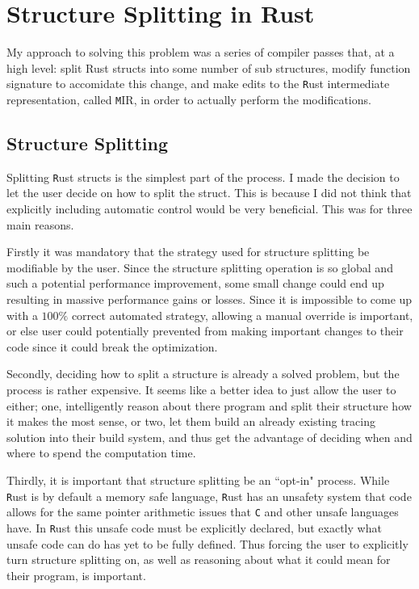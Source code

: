 \documentclass[12pt,final]{article}
\newcommand{\rust}[1]{\texttt{#1}}
\newcommand{\rustname}{{\texttt Rust}}
\def \rust {\rustname{}\xspace}
\newcommand{\mirname}{{\texttt MIR}}
\def \mir {\mirname{}\xspace}
\begin{document}
\section{Structure Splitting in Rust}

My approach to solving this problem was a series of compiler passes that, at a high level:
split Rust structs into some number of sub structures, modify function signature to accomidate this change,
and make edits to the \rust intermediate representation, called \mir, in order 
to actually perform the modifications.

\subsection{Structure Splitting}
Splitting \rust structs is the simplest part of the process. I made the decision to let the user decide
on how to split the struct. This is because I did not think that explicitly including automatic control would 
be very beneficial. This was for three main reasons. 

Firstly it was mandatory that the strategy used for structure splitting be modifiable by the user.
Since the structure splitting operation is so global and such a potential performance improvement,
some small change could end up resulting in massive performance gains or losses. Since it is impossible
to come up with a $100\%$ correct automated strategy, allowing a manual override is important, or else
user could potentially prevented from making important changes to their code since it could break the optimization.

Secondly, deciding how to split a structure is already a solved problem,
but the process is rather expensive. It seems like a better idea to just allow the user to either; one, 
intelligently reason about there program and split their structure how it makes the most sense, or two, 
let them build an already existing tracing solution into their build system, and thus get the advantage
of deciding when and where to spend the computation time.

Thirdly, it is important that structure splitting be an ``opt-in" process. While \rust is by default
a memory safe language, \rust has an unsafety system that code allows for the same pointer arithmetic 
issues that \texttt{C} and other unsafe languages have. In \rust this unsafe code must be explicitly
declared, but exactly what unsafe code can do has yet to be fully defined. Thus forcing the user to explicitly 
turn structure splitting on, as well as reasoning about what it could mean for their program, is important.
\end{document}
